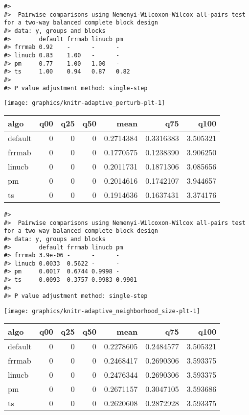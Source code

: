 \documentclass[
]{article}
\begin{document}
\begin{verbatim}
#> 
#>  Pairwise comparisons using Nemenyi-Wilcoxon-Wilcox all-pairs test for a two-way balanced complete block design
#> data: y, groups and blocks
#>        default frrmab linucb pm  
#> frrmab 0.92    -      -      -   
#> linucb 0.83    1.00   -      -   
#> pm     0.77    1.00   1.00   -   
#> ts     1.00    0.94   0.87   0.82
#> 
#> P value adjustment method: single-step
\end{verbatim}

\begin{center}\texttt{[image: graphics/knitr-adaptive\_perturb-plt-1]} \end{center}

\begin{tabular}{lrrrrrr}
\toprule
algo & q00 & q25 & q50 & mean & q75 & q100\\
\midrule
default & 0 & 0 & 0 & 0.2714384 & 0.3316383 & 3.505321\\
frrmab & 0 & 0 & 0 & 0.1770575 & 0.1238390 & 3.906250\\
linucb & 0 & 0 & 0 & 0.2011731 & 0.1871306 & 3.085656\\
pm & 0 & 0 & 0 & 0.2014616 & 0.1742107 & 3.944657\\
ts & 0 & 0 & 0 & 0.1914636 & 0.1637431 & 3.374176\\
\bottomrule
\end{tabular}

\begin{verbatim}
#> 
#>  Pairwise comparisons using Nemenyi-Wilcoxon-Wilcox all-pairs test for a two-way balanced complete block design
#> data: y, groups and blocks
#>        default frrmab linucb pm    
#> frrmab 3.9e-06 -      -      -     
#> linucb 0.0033  0.5622 -      -     
#> pm     0.0017  0.6744 0.9998 -     
#> ts     0.0093  0.3757 0.9983 0.9901
#> 
#> P value adjustment method: single-step
\end{verbatim}

\begin{center}\texttt{[image: graphics/knitr-adaptive\_neighborhood\_size-plt-1]} \end{center}

\begin{tabular}{lrrrrrr}
\toprule
algo & q00 & q25 & q50 & mean & q75 & q100\\
\midrule
default & 0 & 0 & 0 & 0.2278605 & 0.2484577 & 3.505321\\
frrmab & 0 & 0 & 0 & 0.2468417 & 0.2690306 & 3.593375\\
linucb & 0 & 0 & 0 & 0.2476344 & 0.2690306 & 3.593375\\
pm & 0 & 0 & 0 & 0.2671157 & 0.3047105 & 3.593686\\
ts & 0 & 0 & 0 & 0.2620608 & 0.2872928 & 3.593375\\
\bottomrule
\end{tabular}
\end{document}
